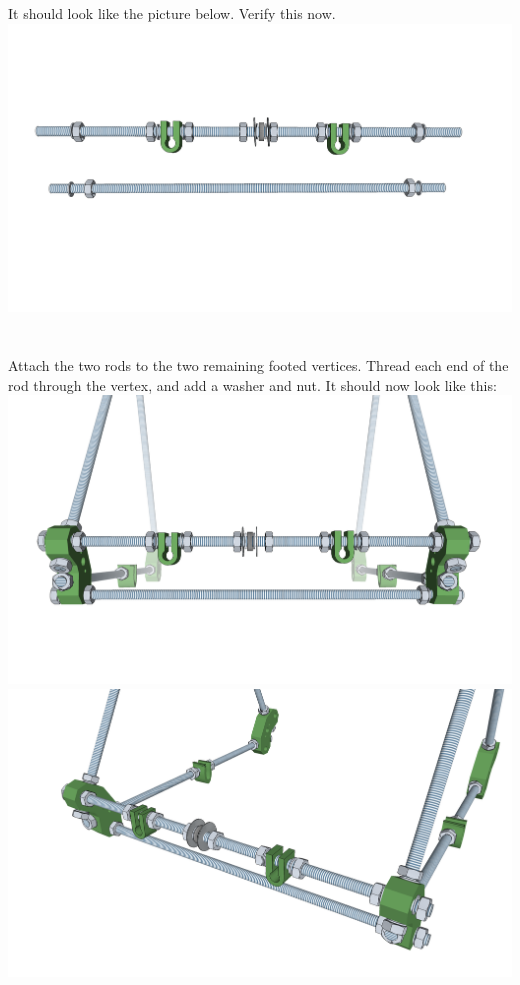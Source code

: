 \documentclass[twoside,a4paper,titlepage]{memoir}
\begin{document}
	\section{}
	It should look like the picture below. Verify this now.\\
	\includegraphics[width=1\linewidth]{graphics/ch3_3.png}
	
	\section{}
	Attach the two rods to the two remaining footed vertices. Thread each end of the rod through the vertex,
	and add a washer and nut. It should now look like this:
	\includegraphics[width=1\linewidth]{graphics/ch3_4_1.png}
	\includegraphics[width=1\linewidth]{graphics/ch3_4_2.png}
	
\end{document}
